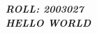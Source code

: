 \documentclass{article}
\begin{document}
\em \bf \Large ROLL: 2003027\\
\LARGE HELLO WORLD
\end{document}
